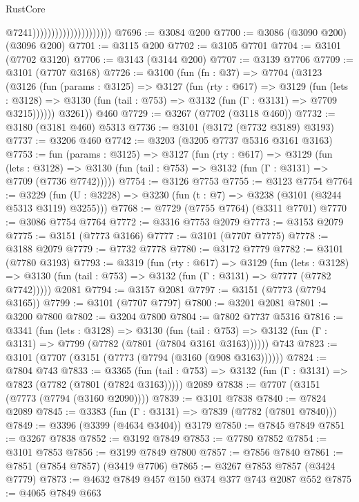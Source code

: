 \begin{lexlean}{RustCore}
\begin{coremodule}
                                              @7241)))))))))))))))))))))
@7696 := @3084 @200
@7700 := @3086 (@3090 @200) (@3096 @200)
@7701 := @3115 @200
@7702 := @3105 @7701
@7704 := @3101 (@7702 @3120)
@7706 := @3143 (@3144 @200)
@7707 := @3139 @7706
@7709 := @3101 (@7707 @3168)
@7726 := @3100
    (fun (fn : @37) =>
    @7704
      (@3123
        (@3126
          (fun (params : @3125) =>
          @3127
            (fun (rty : @617) =>
            @3129
              (fun (lets : @3128) =>
              @3130 (fun (tail : @753) => @3132 (fun (Γ : @3131) => @7709 @3215))))))
        @3261))
    @460
@7729 := @3267 (@7702 (@3118 @460))
@7732 := @3180 (@3181 @460) @5313
@7736 := @3101 (@3172 (@7732 @3189) @3193)
@7737 := @3206 @460
@7742 := @3203 (@3205 @7737 @5316 @3161 @3163)
@7753 := fun (params : @3125) =>
  @3127
    (fun (rty : @617) =>
    @3129
      (fun (lets : @3128) =>
      @3130 (fun (tail : @753) => @3132 (fun (Γ : @3131) => @7709 (@7736 @7742)))))
@7754 := @3126 @7753
@7755 := @3123 @7754
@7764 := @3229 (fun (U : @3228) => @3230 (fun (t : @7) => @3238 (@3101 (@3244 @5313 @3119) @3255)))
@7768 := @7729 (@7755 @7764) (@3311 @7701)
@7770 := @3086 @7754 @7764
@7772 := @3316 @7753 @2079
@7773 := @3153 @2079
@7775 := @3151 (@7773 @3166)
@7777 := @3101 (@7707 @7775)
@7778 := @3188 @2079
@7779 := @7732 @7778
@7780 := @3172 @7779
@7782 := @3101 (@7780 @3193)
@7793 := @3319
    (fun (rty : @617) =>
    @3129
      (fun (lets : @3128) =>
      @3130 (fun (tail : @753) => @3132 (fun (Γ : @3131) => @7777 (@7782 @7742)))))
    @2081
@7794 := @3157 @2081
@7797 := @3151 (@7773 (@7794 @3165))
@7799 := @3101 (@7707 @7797)
@7800 := @3201 @2081
@7801 := @3200 @7800
@7802 := @3204 @7800
@7804 := @7802 @7737 @5316
@7816 := @3341
    (fun (lets : @3128) =>
    @3130
      (fun (tail : @753) => @3132 (fun (Γ : @3131) => @7799 (@7782 (@7801 (@7804 @3161 @3163))))))
    @743
@7823 := @3101 (@7707 (@3151 (@7773 (@7794 (@3160 (@908 @3163))))))
@7824 := @7804 @743
@7833 := @3365
    (fun (tail : @753) => @3132 (fun (Γ : @3131) => @7823 (@7782 (@7801 (@7824 @3163)))))
    @2089
@7838 := @7707 (@3151 (@7773 (@7794 (@3160 @2090))))
@7839 := @3101 @7838
@7840 := @7824 @2089
@7845 := @3383 (fun (Γ : @3131) => @7839 (@7782 (@7801 @7840)))
@7849 := @3396 (@3399 (@4634 @3404)) @3179
@7850 := @7845 @7849
@7851 := @3267 @7838
@7852 := @3192 @7849
@7853 := @7780 @7852
@7854 := @3101 @7853
@7856 := @3199 @7849 @7800
@7857 := @7856 @7840
@7861 := @7851 (@7854 @7857) (@3419 @7706)
@7865 := @3267 @7853 @7857 (@3424 @7779)
@7873 := @4632 @7849 @457 @150 @374 @377 @743 @2087 @552
@7875 := @4065 @7849 @663

\end{coremodule}
\end{lexlean}
